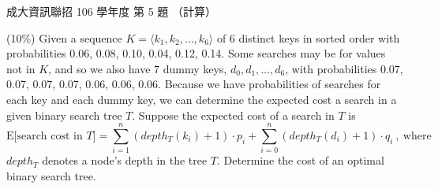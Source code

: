 \begin{pastexam}[label={px:ncku-106-prog-05}]{成大資訊聯招 106 學年度 第 5 題}
（計算）

(10\%) Given a sequence $K=\langle k_1, k_2,\ldots, k_6\rangle$ of 6 distinct keys in sorted order
with probabilities 0.06, 0.08, 0.10, 0.04, 0.12, 0.14. Some searches may be for values not in $K$,
and so we also have 7 dummy keys, $d_0, d_1,\ldots, d_6$, with probabilities 0.07, 0.07, 0.07, 0.07,
0.06, 0.06, 0.06. Because we have probabilities of searches for each key and each dummy key, we can
determine the expected cost a search in a given binary search tree $T$. Suppose the expected cost
of a search in $T$ is
\[
\text{E[search cost in }T]=\sum_{i=1}^{n}(depth_T(k_i)+1)\cdot p_i+\sum_{i=0}^{n}(depth_T(d_i)+1)\cdot q_i\ ,\ \text{where}
\]
$depth_T$ denotes a node's depth in the tree $T$. Determine the cost of an optimal binary search
tree.
\end{pastexam}

